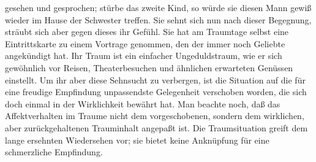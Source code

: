\documentclass[twoside=true,titlepage=false,open=any, parskip=never, fontsize=10pt, headings=small, chapterprefix=false, appendixprefix=false]{scrbook}
\begin{document}
         
            
            
            
        \pstart
        gesehen und gesprochen; stürbe das zweite Kind, so würde sie diesen
               Mann gewiß wieder im Hause der Schwester treffen. Sie sehnt sich nun nach dieser
               Begegnung, sträubt sich aber gegen dieses ihr Gefühl. Sie hat am Traumtage
               selbst eine Eintrittskarte zu einem Vortrage genommen, den der immer noch
               Geliebte angekündigt hat. Ihr Traum ist ein einfacher Ungeduldstraum,
               wie er sich gewöhnlich vor Reisen, Theaterbesuchen und ähnlichen erwarteten
               Genüssen einstellt. Um ihr aber diese Sehnsucht zu verbergen, ist die Situation
               auf die für eine freudige Empfindung unpassendste Gelegenheit verschoben worden,
               die sich doch einmal in der Wirklichkeit bewährt hat. Man beachte
               noch, daß das Affektverhalten im Traume nicht dem vorgeschobenen, sondern
               dem wirklichen, aber zurückgehaltenen Trauminhalt angepaßt ist. Die
               Traumsituation greift dem lange ersehnten Wiedersehen vor; sie bietet keine
               Anknüpfung für eine schmerzliche Empfindung.
        \pend
    
         
            
            
            \pstart[\section{X}]\pend
            
\end{document}

